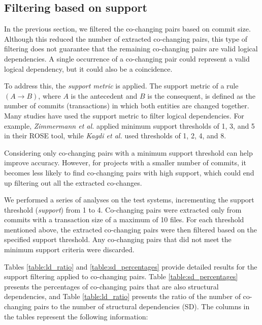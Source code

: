 \subsection{Filtering based on support}
\label{subsec:filtering_support}

\hspace{4em}In the previous section, we filtered the co-changing pairs based on commit size. Although this reduced the number of extracted co-changing pairs, this type of filtering does not guarantee that the remaining co-changing pairs are valid logical dependencies. A single occurrence of a co-changing pair could represent a valid logical dependency, but it could also be a coincidence.  

To address this, the \textit{support metric} is applied. The support metric of a rule $(A \rightarrow B)$, where $A$ is the antecedent and $B$ is the consequent, is defined as the number of commits (transactions) in which both entities are changed together. Many studies have used the support metric to filter logical dependencies. For example, \textit{Zimmermann et al.} \cite{Zimmermann:2004:MVH:998675.999460} applied minimum support thresholds of 1, 3, and 5 in their ROSE tool, while \textit{Kagdi et al.} \cite{article-Kagdi-commit} used thresholds of 1, 2, 4, and 8.

Considering only co-changing pairs with a minimum support threshold can help improve accuracy. However, for projects with a smaller number of commits, it becomes less likely to find co-changing pairs with high support, which could end up filtering out all the extracted co-changes.

We performed a series of analyses on the test systems, incrementing the support threshold (\textit{support}) from 1 to 4. Co-changing pairs were extracted only from commits with a transaction size of a maximum of 10 files. For each threshold mentioned above, the extracted co-changing pairs were then filtered based on the specified support threshold. Any co-changing pairs that did not meet the minimum support criteria were discarded.


Tables \ref{table:ld_ratio} and \ref{table:sd_percentages} provide detailed results for the support filtering applied to co-changing pairs. Table \ref{table:sd_percentages} presents the percentages of co-changing pairs that are also structural dependencies, and Table \ref{table:ld_ratio} presents the ratio of the number of co-changing pairs to the number of structural dependencies (SD). The columns in the tables represent the following information:

